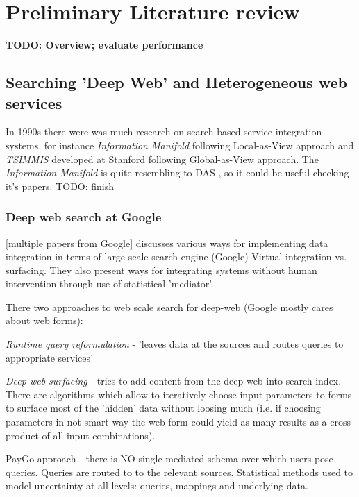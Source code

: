\section{Preliminary Literature review}


\textbf{\color{red}TODO: Overview; evaluate performance}

\subsection{Searching 'Deep Web' and Heterogeneous web services}

In 1990s there were was much research on search based service integration systems, for instance \textit{Information Manifold} following Local-as-View approach and \textit{TSIMMIS} developed at Stanford following Global-as-View approach. The \textit{Information Manifold} is quite resembling to DAS {\color{red},  so it could be useful checking it's papers. TODO: finish}


\subsubsection*{Deep web search at Google}
[multiple papers from Google] discusses various ways for implementing data integration in terms of large-scale search engine (Google) Virtual integration vs. surfacing. They also present ways for integrating systems without human intervention through use of statistical 'mediator'.

There two approaches to web scale search for deep-web (Google mostly cares about web forms):

\textit{Runtime query reformulation} - 'leaves data at the sources and routes queries to appropriate services'\cite[p. 1]{paygo_integration} 

\textit{Deep-web surfacing} - tries to add content from the deep-web into search index. There are algorithms which allow to iteratively choose input parameters to forms to surface most of the 'hidden' data without loosing much (i.e. if choosing parameters in not smart way the web form could yield as many results as a cross product of all input combinations).

PayGo approach - there is NO single mediated schema over which users pose queries. Queries are routed to to the relevant sources. Statistical methods used to model uncertainty at all levels: queries, mappings and underlying data.


